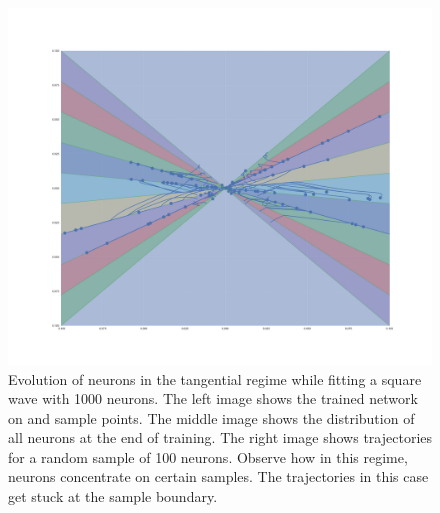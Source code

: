 \begin{figure}
    \includegraphics[width=\linewidth]{figures/neuron_trajectories.pdf}
    \endminipage
    \caption{Evolution of neurons in the tangential regime while fitting a square wave with 1000 neurons. The left image shows the trained network on and sample points. The middle image shows the distribution of all neurons at the end of training. The right image shows trajectories for a random sample of 100 neurons. Observe how in this regime, neurons concentrate on certain samples. The trajectories in this case get stuck at the sample boundary.}
    \label{fig:tangential_trajectories}
\end{figure}



